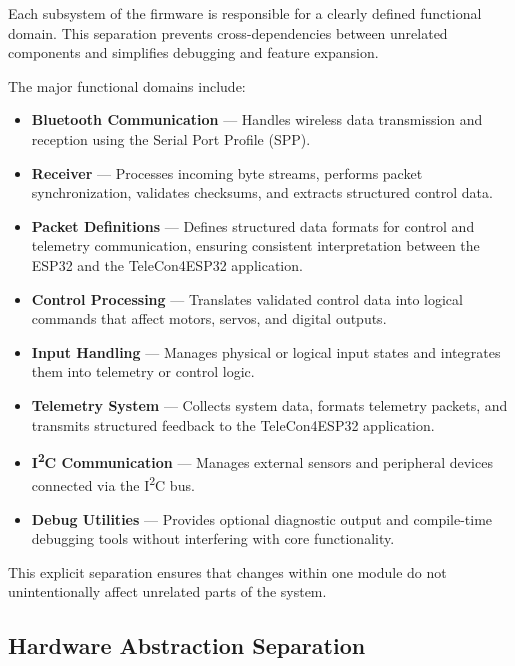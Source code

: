Each subsystem of the firmware is responsible for a clearly defined functional domain. This separation prevents cross-dependencies between unrelated components and simplifies debugging and feature expansion.

The major functional domains include:

\begin{itemize}
	\item \textbf{Bluetooth Communication} — Handles wireless data transmission and reception using the Serial Port Profile (SPP).
	
	\item \textbf{Receiver} — Processes incoming byte streams, performs packet synchronization, validates checksums, and extracts structured control data.
	
	\item \textbf{Packet Definitions} — Defines structured data formats for control and telemetry communication, ensuring consistent interpretation between the ESP32 and the TeleCon4ESP32 application.
	
	\item \textbf{Control Processing} — Translates validated control data into logical commands that affect motors, servos, and digital outputs.
	
	\item \textbf{Input Handling} — Manages physical or logical input states and integrates them into telemetry or control logic.
	
	\item \textbf{Telemetry System} — Collects system data, formats telemetry packets, and transmits structured feedback to the TeleCon4ESP32 application.
	
	\item \textbf{I\textsuperscript{2}C Communication} — Manages external sensors and peripheral devices connected via the I\textsuperscript{2}C bus.
	
	\item \textbf{Debug Utilities} — Provides optional diagnostic output and compile-time debugging tools without interfering with core functionality.
\end{itemize}

This explicit separation ensures that changes within one module do not unintentionally affect unrelated parts of the system.

\subsection{Hardware Abstraction Separation}

